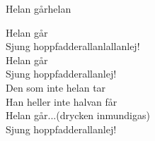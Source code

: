 \begin{song}{Helan går}{helan}
\begin{vers}
Helan går\\
Sjung hoppfadderallanlallanlej!\\
Helan går\\
Sjung hoppfadderallanlej!\\
Den som inte helan tar\\
Han heller inte halvan får\\
Helan går...(drycken inmundigas)\\
Sjung hoppfadderallanlej!\\
\end{vers}
\end{song}
